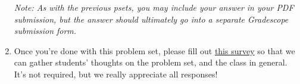\documentclass[11pt]{article}
\begin{document}
\begin{enumerate}
    \textit{Note: As with the previous psets, you may include your answer in your PDF submission, but the answer should ultimately go into a separate Gradescope submission form.}

    \item Once you're done with this problem set, please fill out \href{https://forms.gle/4D5u71QSidk4VLoV9}{this survey} so that we can gather students' thoughts on the problem set, and the class in general. It's not required, but we really appreciate all responses!
    
\end{enumerate}
\end{document}
